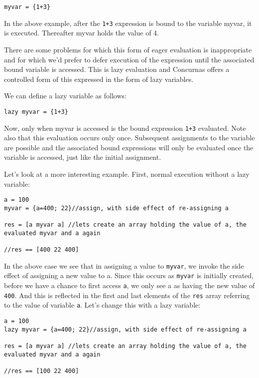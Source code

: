 \documentclass[conc-doc]{subfiles}
\begin{document}
\begin{lstlisting}
myvar = {1+3}
\end{lstlisting}

In the above example, after the \lstinline{1+3} expression is bound to the variable myvar, it is executed. Thereafter myvar holds the value of 4.

There are some problems for which this form of eager evaluation is inappropriate and for which we’d prefer to defer execution of the expression until the associated bound variable is accessed. This is lazy evaluation and Concurnas offers a controlled form of this expressed in the form of lazy variables.

We can define a lazy variable as follows:
\begin{lstlisting}
lazy myvar = {1+3}
\end{lstlisting}

Now, only when myvar is accessed is the bound expression \lstinline{1+3} evaluated. Note also that this evaluation occurs only once. Subsequent assignments to the variable are possible and the associated bound expressions will only be evaluated once the variable is accessed, just like the initial assignment.

Let’s look at a more interesting example. First, normal execution without a lazy variable:

\begin{lstlisting}
a = 100
myvar = {a=400; 22}//assign, with side effect of re-assigning a

res = [a myvar a] //lets create an array holding the value of a, the evaluated myvar and a again

//res == [400 22 400]
\end{lstlisting}

In the above case we see that in assigning a value to \lstinline{myvar}, we invoke the side effect of assigning a new value to a. Since this occurs as \lstinline{myvar} is initially created, before we have a chance to first access \lstinline{a}, we only see a as having the new value of \lstinline{400}. And this is reflected in the first and last elements of the \lstinline{res} array referring to the value of variable \lstinline{a}. Let’s change this with a lazy variable:

\begin{lstlisting}
a = 100
lazy myvar = {a=400; 22}//assign, with side effect of re-assigning a

res = [a myvar a] //lets create an array holding the value of a, the evaluated myvar and a again

//res == [100 22 400]
\end{lstlisting}
\end{document}
